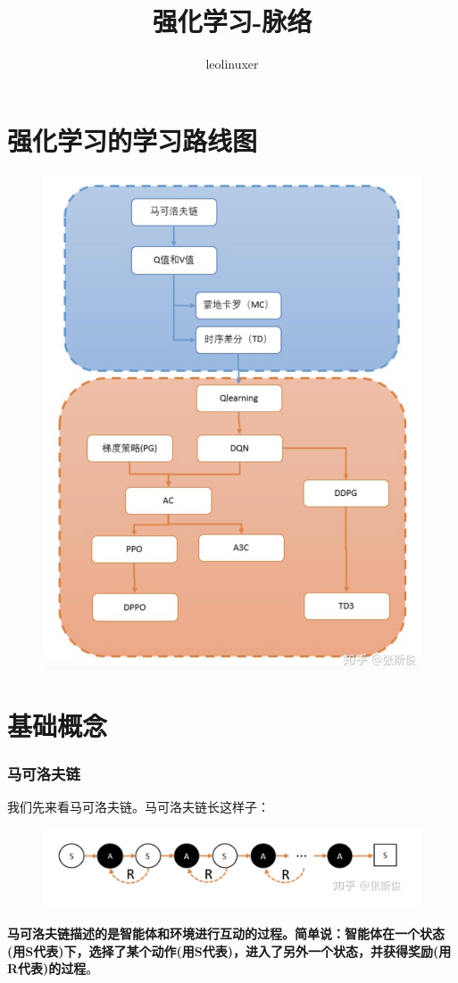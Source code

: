 \documentclass[12pt]{article}
\title{强化学习-脉络\cite{RL_Learning_Route}}
\author{leolinuxer}
\begin{document}
\maketitle
\tableofcontents

\part{强化学习的学习路线图}
\begin{figure}[H]
    \centering
    \includegraphics[width=.5\textwidth]{fig/ReinforcementLearning/RL_Learning_Route.png}
\end{figure}

\part{基础概念}
\section{马可洛夫链\cite{How_To_Understand_Markov_Chain}}
我们先来看马可洛夫链。马可洛夫链长这样子：
\begin{figure}[H]
    \centering
    \includegraphics[width=.6\textwidth]{fig/ReinforcementLearning/RL_Markov_Chain_Example.png}
\end{figure}

\textbf{马可洛夫链描述的是智能体和环境进行互动的过程。简单说：智能体在一个状态(用S代表)下，选择了某个动作(用S代表)，进入了另外一个状态，并获得奖励(用R代表)的过程}。
\end{document}

